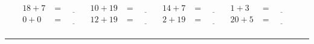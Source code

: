\documentclass{article}
\begin{document}
\begin{sloppy}
\begin{align*}
    {18} + {7} &= \underline{\hspace{1cm}} & {10} + {19} &= \underline{\hspace{1cm}} & {14} + {7} &= \underline{\hspace{1cm}} & {1} + {3} &= \underline{\hspace{1cm}} \\
    {0} + {0} &= \underline{\hspace{1cm}} & {12} + {19} &= \underline{\hspace{1cm}} & {2} + {19} &= \underline{\hspace{1cm}} & {20} + {5} &= \underline{\hspace{1cm}} \\
\end{align*}
\hrule
\end{sloppy}
\end{document}
